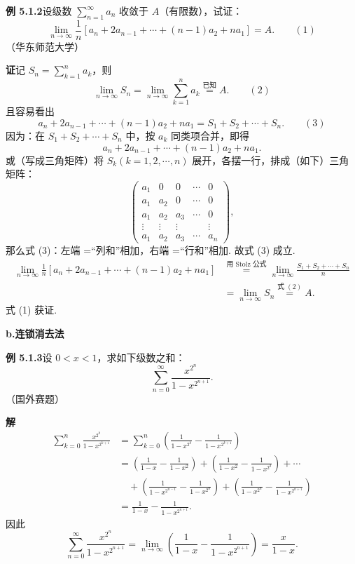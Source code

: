 \documentclass[UTF8,12pt,a4paper,fontset=fandol]{ctexart}
\begin{document}
\noindent\textbf{例 5.1.2}\quad 设级数 $\displaystyle\sum_{n=1}^\infty a_n$ 收敛于 $A$（有限数），试证：
\[
  \lim_{n\to\infty}\frac1n\left[a_n+2a_{n-1}+\cdots+(n-1)a_2+na_1\right]=A.
\qquad(1)
\]
（华东师范大学）

\noindent\textbf{证}\quad 记 $S_n=\displaystyle\sum_{k=1}^n a_k$，则
\[
  \lim_{n\to\infty}S_n=\lim_{n\to\infty}\sum_{k=1}^n a_k\stackrel{\text{已知}}{=}A.
\qquad(2)
\]
且容易看出
\[
  a_n+2a_{n-1}+\cdots+(n-1)a_2+na_1=S_1+S_2+\cdots+S_n.
\qquad(3)
\]
因为：在 $S_1+S_2+\cdots+S_n$ 中，按 $a_k$ 同类项合并，即得
\[
  a_n+2a_{n-1}+\cdots+(n-1)a_2+na_1.
\]
或（写成三角矩阵）将 $S_k(k=1,2,\cdots,n)$ 展开，各摆一行，排成（如下）三角矩阵：
\[
\begin{pmatrix}
a_1&0&0&\cdots&0\\
a_1&a_2&0&\cdots&0\\
a_1&a_2&a_3&\cdots&0\\
\vdots&\vdots&\vdots& &\vdots\\
a_1&a_2&a_3&\cdots&a_n
\end{pmatrix},
\]
那么式 (3)：左端 =“列和”相加，右端 =“行和”相加. 故式 (3) 成立.
\[
\begin{aligned}
\lim_{n\to\infty}\frac1n\left[a_n+2a_{n-1}+\cdots+(n-1)a_2+na_1\right]
&\stackrel{\text{用 Stolz 公式}}{=}
\lim_{n\to\infty}\frac{S_1+S_2+\cdots+S_n}{n}\\
&=\lim_{n\to\infty}S_n\stackrel{\text{式 }(2)}{=}A.
\end{aligned}
\]
式 (1) 获证.

\noindent\textbf{b.\quad 连锁消去法}

\noindent\textbf{例 5.1.3}\quad 设 $0<x<1$，求如下级数之和：
\[
  \sum_{n=0}^\infty \frac{x^{2^n}}{1-x^{2^{n+1}}}.
\]
（国外赛题）

\noindent\textbf{解}\quad
\[
\begin{aligned}
\sum_{k=0}^n \frac{x^{2^k}}{1-x^{2^{k+1}}}
&=\sum_{k=0}^n\left(\frac1{1-x^{2^k}}-\frac1{1-x^{2^{k+1}}}\right)\\
&=\left(\frac1{1-x}-\frac1{1-x^2}\right)
 +\left(\frac1{1-x^2}-\frac1{1-x^{2^2}}\right)+\cdots\\
&\quad+\left(\frac1{1-x^{2^{n-1}}}-\frac1{1-x^{2^n}}\right)
 +\left(\frac1{1-x^{2^n}}-\frac1{1-x^{2^{n+1}}}\right)\\
&=\frac1{1-x}-\frac1{1-x^{2^{n+1}}}.
\end{aligned}
\]
因此
\[
  \sum_{n=0}^\infty \frac{x^{2^n}}{1-x^{2^{n+1}}}
  =\lim_{n\to\infty}\left(\frac1{1-x}-\frac1{1-x^{2^{n+1}}}\right)
  =\frac{x}{1-x}.
\]
\end{document}
